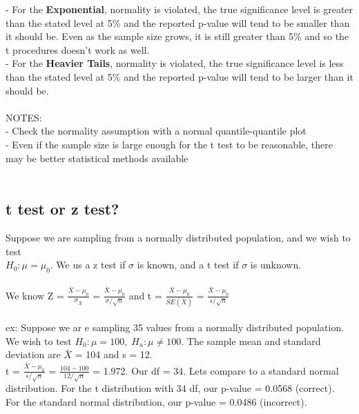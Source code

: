\documentclass[12pt, a4paper]{article}
\begin{document}
		- For the \textbf{Exponential}, normality is violated, the true significance level is greater than the \hspace*{2mm} stated level at 5\% and the reported p-value will tend to be smaller than it should be. Even \hspace*{2mm} as the sample size grows, it is still greater than 5\% and so the t procedures doesn't work as \hspace*{2mm} well. \\
		- For the \textbf{Heavier Tails}, normality is violated, the true significance level is less than the \hspace*{2mm} stated level at 5\% and the reported p-value will tend to be larger than it should be. \\~\\
		NOTES: \\
		- Check the normality assumption with a normal quantile-quantile plot \\
		- Even if the sample size is large enough for the t test to be reasonable, there may be better \hspace*{2mm} statistical methods available \\~\\
		
	\subsection{t test or z test?}
	Suppose we are sampling from a normally distributed population, and we wish to test \\ $H_0: \mu = \mu_0$. We us a z test if $\sigma$ is known, and a t test if $\sigma$ is unknown. \\~\\
	We know Z = $\frac{\bar{X} - \mu_0}{\sigma_{\bar{X}}}$ = $\frac{\bar{X} - \mu_0}{\sigma/\sqrt{n}}$ and t = $\frac{\bar{X} - \mu_0}{SE(\bar{X})}$ = $\frac{\bar{X} - \mu_0}{s/\sqrt{n}}$ \\~\\
	ex: Suppose we ar e sampling 35 values from a normally distributed population. We wish to test $H_0: \mu = 100,\; H_a: \mu \neq 100$. The sample mean and standard deviation are $\bar{X}$ = 104 and s = 12. \\
	t = $\frac{\bar{X} - \mu_0}{s/\sqrt{n}}$ = $\frac{104-100}{12/\sqrt{n}}$ = 1.972. Our df = 34. Lets compare to a standard normal distribution. For the t distribution with 34 df, our p-value = 0.0568 (correct).\\
	For the standard normal distribution, our p-value = 0.0486 (incorrect). \newpage
\end{document}
